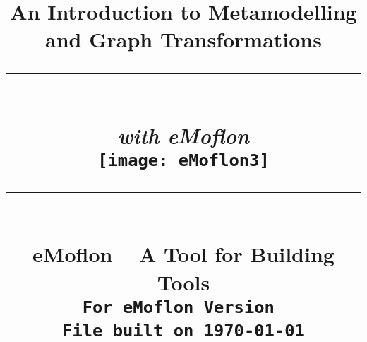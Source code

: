 \title{
\flushright
{\LARGE\bfseries An Introduction to Metamodelling\\
and Graph Transformations}
\noindent\rule[-1ex]{\textwidth}{5pt}\\[2.5ex]
\hfill\emph{\LARGE\bfseries with eMoflon}\\
\center
\texttt{[image: eMoflon3]}
\flushleft
\noindent\rule[-1ex]{0.5\textwidth}{1.5pt}\\[1.5 ex]
\Large\bfseries eMoflon -- A Tool for Building Tools\\
{\small \texttt{For eMoflon Version \versionNumber}}\\
{\small \texttt{File built on \today}}\\    
} %

\date{}  
\author{} 